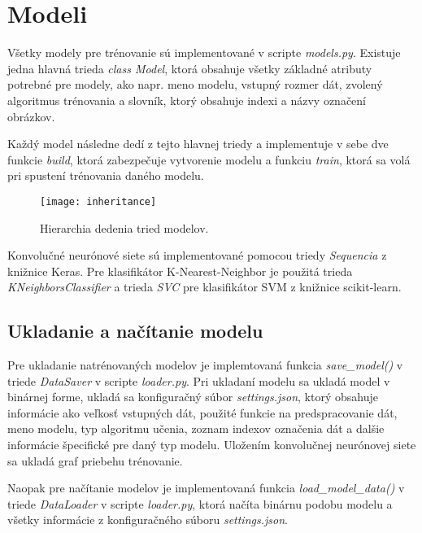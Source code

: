 
\section{Modeli}
\label{sec:modely}
Všetky modely pre trénovanie sú implementované v scripte \textit{models.py}.
Existuje jedna hlavná trieda \textit{class Model}, ktorá obsahuje všetky základné atributy potrebné pre modely, ako napr.
    meno modelu, vstupný rozmer dát, zvolený algoritmus trénovania a slovník, ktorý obsahuje indexi a názvy označení obrázkov.

Každý model následne dedí z tejto hlavnej triedy a implementuje v sebe dve funkcie \textit{build}, ktorá zabezpečuje vytvorenie modelu a
    funkciu \textit{train}, ktorá sa volá pri spustení trénovania daného modelu.

\begin{figure}[H]
    \centering
    \texttt{[image: inheritance]}
    \caption{Hierarchia dedenia tried modelov.}
    \label{pic:inheritance}
\end{figure}

Konvolučné neurónové siete sú implementované pomocou triedy \textit{Sequencia} z knižnice Keras.
Pre klasifikátor K-Nearest-Neighbor je použitá trieda \textit{KNeighborsClassifier} a trieda \textit{SVC} pre klasifikátor SVM z knižnice scikit-learn.


\subsection{Ukladanie a načítanie modelu}
\label{subsec:ukladaniemodelu}
Pre ukladanie natrénovaných modelov je implemtovaná funkcia \textit{save\_model()} v triede \textit{DataSaver} v scripte \textit{loader.py}.
Pri ukladaní modelu sa ukladá model v binárnej forme, ukladá sa konfiguračný súbor \textit{settings.json}, ktorý obsahuje informácie ako veľkosť
    vstupných dát, použité funkcie na predspracovanie dát, meno modelu, typ algoritmu učenia, zoznam indexov označenia dát a dalšie informácie
    špecifické pre daný typ modelu.
Uložením konvolučnej neurónovej siete sa ukladá graf priebehu trénovanie.

Naopak pre načítanie modelov je implementovaná funkcia \textit{load\_model\_data()} v triede \textit{DataLoader} v scripte \textit{loader.py},
    ktorá načíta binárnu podobu modelu a všetky informácie z konfiguračného súboru \textit{settings.json}.
